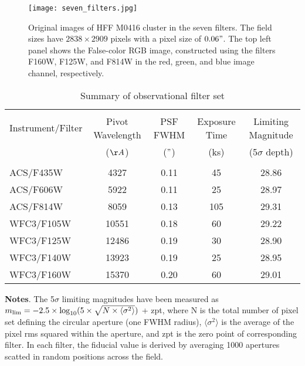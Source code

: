 \documentclass[12pt]{article}
\begin{document}
\begin{figure}[h]
\begin{center}
\texttt{[image: seven\_filters.jpg]}
\caption{\footnotesize Original images of HFF M0416 cluster in the seven filters. The field sizes have $2838 \times 2909$ pixels with a pixel size of $0.06"$. The top left panel shows the False-color RGB image, constructed using the filters F160W, F125W, and F814W in the red, green, and blue image channel, respectively.}
\end{center}
\end{figure}

\begin{table}
\begin{threeparttable}
\begin{center}
\caption{ Summary of observational filter set}
\begin{tabular}{lcccc}
\hline
\hline \\[-1.4ex]
Instrument/Filter&Pivot Wavelength&PSF FWHM&Exposure Time&Limiting Magnitude\\[0.2ex]
&($\AA$)& ($"$)&(ks)&(5$\sigma$ depth)\\
\hline\\[-1.4ex]
ACS/F435W&4327&0.11&45&28.86\\ 
ACS/F606W&5922&0.11&25&28.97\\
ACS/F814W&8059&0.13&105&29.31\\
WFC3/F105W&10551&0.18&60&29.22\\
WFC3/F125W&12486&0.19&30&28.90\\
WFC3/F140W&13923&0.19&25&28.95\\
WFC3/F160W&15370&0.20&60&29.01\\
\hline
\end{tabular}
\begin{tablenotes}
\item {\bf \footnotesize Notes}. \footnotesize The 5$\sigma$ limiting magnitudes have been measured as $m_{\rm lim}=-2.5 \times {\rm log}_{10}( 5\times \sqrt{N \times \langle \sigma^2 \rangle})$ + zpt,  where N is the total number of pixel set defining the circular aperture (one FWHM radius), $\langle \sigma^2 \rangle$ is the average of the pixel rms squared within the aperture,  and zpt is the zero point of  corresponding filter. 
In each filter, the fiducial value is derived by averaging 1000 apertures scatted in random positions across the field.
\end{tablenotes}
\end{center}
\end{threeparttable}
\end{table}
\end{document}
